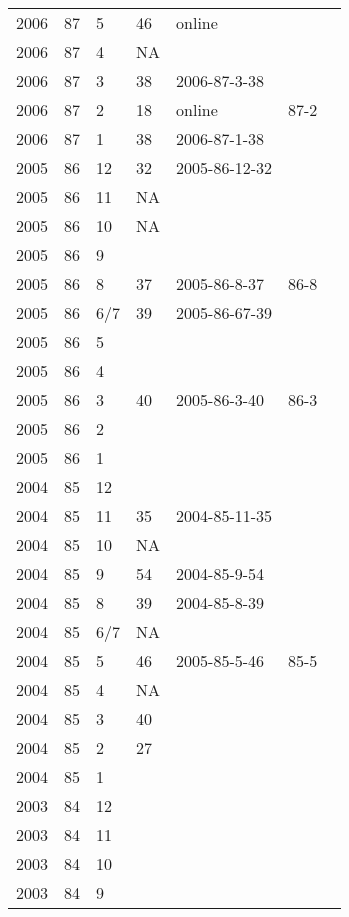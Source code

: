 \begin{longtable}{ |l|l|l|l|p{2.7cm}|l|p{2cm}| }
 2006 & 87 &     5 &      46 & online &  & \\
 2006 & 87 &     4 &      NA &  &  & \\
 2006 & 87 &     3 &      38 & 2006-87-3-38 &  & \\
 2006 & 87 &     2 &      18 & online & 87-2  & \\
 2006 & 87 &     1 &      38 & 2006-87-1-38 &  & \\
 2005 & 86 &    12 &      32 & 2005-86-12-32 &  & \\
 2005 & 86 &    11 &      NA &  &  & \\
 2005 & 86 &    10 &      NA &  &  & \\
 2005 & 86 &     9 &         &  &  & \\
 2005 & 86 &     8 &      37 & 2005-86-8-37 & 86-8  & \\
 2005 & 86 &   6/7 &      39 & 2005-86-67-39 &  & \\
 2005 & 86 &     5 &         &  &  & \\
 2005 & 86 &     4 &         & &  & \\
 2005 & 86 &     3 &      40 &  2005-86-3-40 & 86-3 & \\
 2005 & 86 &     2 &         &  &  & \\
 2005 & 86 &     1 &         &  &  & \\
 2004 & 85 &    12 &         &  &  & \\
 2004 & 85 &    11 &      35 & 2004-85-11-35 &  & \\
 2004 & 85 &    10 &      NA &  &  & \\
 2004 & 85 &     9 &      54 & 2004-85-9-54 &  & \\
 2004 & 85 &     8 &      39 & 2004-85-8-39 &  & \\
 2004 & 85 &   6/7 &      NA &  &  & \\
 2004 & 85 &     5 &      46 & 2005-85-5-46 & 85-5 & \\
 2004 & 85 &     4 &      NA &  &  & \\
 2004 & 85 &     3 &      40 &  &  & \\
 2004 & 85 &     2 &      27 &  &  & \\
 2004 & 85 &     1 &         &  &  & \\
 2003 & 84 &    12 &         &  &  & \\
 2003 & 84 &    11 &         &  &  & \\
 2003 & 84 &    10 &         &  &  & \\
 2003 & 84 &     9 &         &  &  & \\

\end{longtable}
